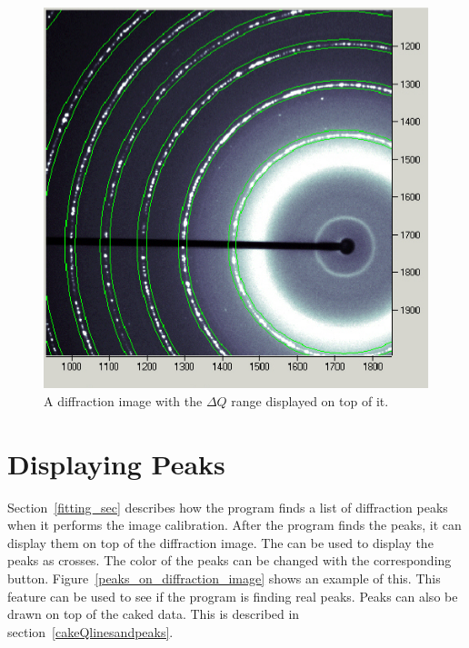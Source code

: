 \begin{figure}
    \centering
    \includegraphics[scale=.75]
    {figures/constant_dq_lines_on_diffraction_image.eps}
    \caption{A diffraction image with the $\Delta Q$ range 
    displayed on top of it.}
    \label{constant_dq_lines_on_diffraction_image}
\end{figure}

\section{Displaying Peaks}
    \label{displaying_peaks_diffraction}

Section~\ref{fitting_sec} describes how the 
program finds a list of diffraction peaks 
when it performs the image calibration.  
After the program finds the peaks, it can display 
them on top of the diffraction image. 
The  can be used to 
display the peaks as crosses. 
The color of the peaks can be changed with the 
corresponding  button.  
Figure~\ref{peaks_on_diffraction_image} shows 
an example of this. This feature can be used
to see if the program is finding real peaks.
Peaks can also be drawn on top of the caked data. This 
is described in section~\ref{cakeQlinesandpeaks}.

